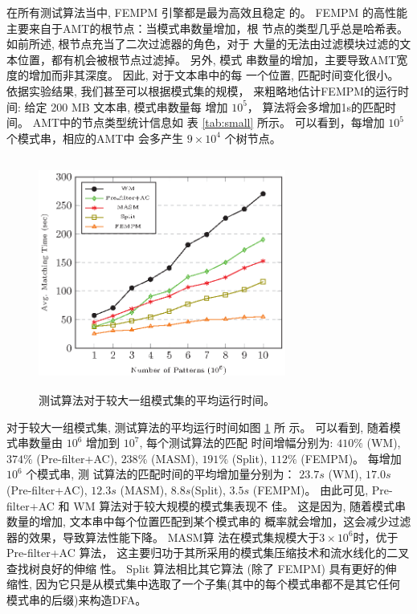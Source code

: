 在所有测试算法当中, \textsf{FEMPM} 引擎都是最为高效且稳定
的。 \textsf{FEMPM} 的高性能主要来自于AMT的根节点：当模式串数量增加，根
节点的类型几乎总是哈希表。 如前所述, 根节点充当了二次过滤器的角色，对于
大量的无法由过滤模块过滤的文本位置，都有机会被根节点过滤掉。 另外, 模式
串数量的增加，主要导致AMT宽度的增加而非其深度。 因此, 对于文本串中的每
一个位置, 匹配时间变化很小。 依据实验结果, 我们甚至可以根据模式集的规模，
来粗略地估计\textsf{FEMPM}的运行时间: 给定 200 MB 文本串, 模式串数量每
增加 $10^5$， 算法将会多增加1s的匹配时间。 AMT中的节点类型统计信息如
表 \ref{tab:small} 所示。 可以看到，每增加 $10^5$ 个模式串，相应的AMT中
会多产生 $9 \times 10^4$ 个树节点。

\begin{figure}[H]
  \centering
  \includegraphics[height=3in, width=3.2in]{figures/2_MPM/large_group}
  \caption{测试算法对于较大一组模式集的平均运行时间。}
  \label{fig:large_group}
\end{figure}

对于较大一组模式集, 测试算法的平均运行时间如图 \ref{fig:large_group} 所
示。 可以看到, 随着模式串数量由 $10^6$ 增加到 $10^7$, 每个测试算法的匹配
时间增幅分别为: $410\%$ (\textsf{WM}), $374\%$
(\textsf{Pre-filter+AC}), $238\%$ (\textsf{MASM}), $191\%$
(\textsf{Split}), $112\%$ (\textsf{FEMPM})。 每增加 $10^6$ 个模式串, 测
试算法的匹配时间的平均增加量分别为： $23.7s$ (\textsf{WM}), $17.0s$
(\textsf{Pre-filter+AC}), $12.3s$ (\textsf{MASM}),
$8.8s$(\textsf{Split}), $3.5s$ (\textsf{FEMPM})。 由此可见,
\textsf{Pre-filter+AC} 和 \textsf{WM} 算法对于较大规模的模式集表现不
佳。 这是因为, 随着模式串数量的增加, 文本串中每个位置匹配到某个模式串的
概率就会增加，这会减少过滤器的效果，导致算法性能下降。 \textsf{MASM}算
法在模式集规模大于$3 \times 10^6$时，优于 \textsf{Pre-filter+AC} 算法，
这主要归功于其所采用的模式集压缩技术和流水线化的二叉查找树良好的伸缩
性。 \textsf{Split} 算法相比其它算法 (除了 \textsf{FEMPM}) 具有更好的伸
缩性, 因为它只是从模式集中选取了一个子集(其中的每个模式串都不是其它任何
模式串的后缀)来构造DFA。

